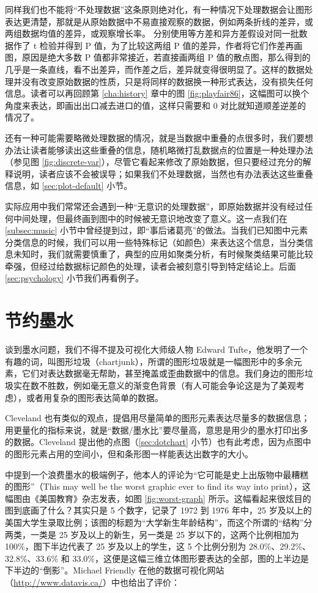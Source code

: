 \documentclass[
  b5paper,
  UTF8,twoside]{book}
\begin{document}
同样我们也不能将``不处理数据''这条原则绝对化，有一种情况下处理数据会让图形表达更清楚，那就是从原始数据中不易直接观察的数据，例如两条折线的差异，或两组数据均值的差异，或观察增长率。 \citet{Xie10Thesis} 分别使用等方差和异方差假设对同一批数据作了 t 检验并得到 P 值，为了比较这两组 P 值的差异，作者将它们作差再画图，原因是绝大多数 P 值都非常接近，若直接画两组 P 值的散点图，那么得到的几乎是一条直线，看不出差异，而作差之后，差异就变得很明显了。这样的数据处理并没有改变原始数据的性质，只是将同样的数据换一种形式表达，没有损失任何信息。读者可以再回顾第 \ref{cha:history} 章中的图 \ref{fig:playfair86}，这幅图可以换个角度来表达，即画出出口减去进口的值，这样只需要和 0 对比就知道顺差逆差的情况了。

还有一种可能需要略微处理数据的情况，就是当数据中重叠的点很多时，我们要想办法让读者能够读出这些重叠的信息，随机略微打乱数据点的位置是一种处理办法（参见图 \ref{fig:discrete-var}），尽管它看起来修改了原始数据，但只要经过充分的解释说明，读者应该不会被误导；如果我们不处理数据，当然也有办法表达这些重叠信息，如 \ref{sec:plot-default} 小节。

实际应用中我们常常还会遇到一种``无意识的处理数据''，即原始数据并没有经过任何中间处理，但最终画到图中的时候被无意识地改变了意义。这一点我们在 \ref{subsec:music} 小节中曾经提到过，即``事后诸葛亮''的做法。当我们已知图中元素分类信息的时候，我们可以用一些特殊标记（如颜色）来表达这个信息，当分类信息未知时，我们就需要慎重了，典型的应用如聚类分析，有时候聚类结果可能比较牵强，但经过给数据标记颜色的处理，读者会被刻意引导到特定结论上。后面 \ref{sec:psychology} 小节我们再看例子。

\section{节约墨水}\label{ux8282ux7ea6ux58a8ux6c34}

谈到墨水问题，我们不得不提及可视化大师级人物 Edward Tufte，他发明了一个有趣的词，叫图形垃圾（chartjunk），所谓的图形垃圾就是一幅图形中的多余元素，它们对表达数据毫无帮助，甚至掩盖或歪曲数据中的信息。我们身边的图形垃圾实在数不胜数，例如毫无意义的渐变色背景（有人可能会争论这是为了美观考虑），或者用复杂的图形表达简单的数据。

Cleveland 也有类似的观点，提倡用尽量简单的图形元素表达尽量多的数据信息；用更量化的指标来说，就是``数据/墨水比''要尽量高，意思是用少的墨水打印出多的数据。Cleveland 提出他的点图（\ref{sec:dotchart} 小节）也有此考虑，因为点图中的图形元素占用的空间小，但和条形图一样能表达出数字的大小。

\citet{Tufte01} 中提到一个浪费墨水的极端例子，他本人的评论为``它可能是史上出版物中最糟糕的图形''（This may well be the worst graphic ever to find its way into print），这幅图由《美国教育》杂志发表，如图 \ref{fig:worst-graph} 所示。这幅看起来很炫目的图到底画了什么？其实只是 5 个数字，记录了 1972 到 1976 年中，25 岁及以上的美国大学生录取比例；该图的标题为``大学新生年龄结构''，而这个所谓的``结构''分两类，一类是 25 岁及以上的新生，另一类是 25 岁以下的，这两个比例相加为 100\%，图下半边代表了 25 岁及以上的学生，这 5 个比例分别为 28.0\%、29.2\%、32.8\%、33.6\% 和 33.0\%，这便是这幅三维立体图形要表达的全部，图的上半边是下半边的``倒影''。Michael Friendly 在他的数据可视化网站（\url{http://www.datavis.ca/}）中也给出了评价：
\end{document}
